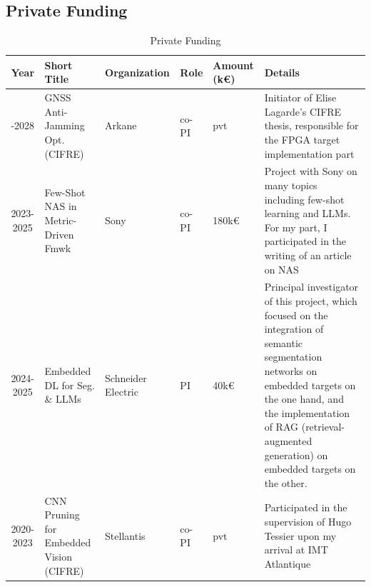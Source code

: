 \documentclass[11pt]{report}
\begin{document}
\begin{landscape}
  \subsection{Private Funding}
  {\small
    \begin{longtable}{|c|l|p{3cm}|p{1cm}|p{1.5cm}|p{6.5cm}|}
      \caption{Private Funding} \label{tab:financements_prives}                                                                                                                                                                                                                                                                                                                 \\
      \hline
      \textbf{Year} & \textbf{Short Title}                    & \textbf{Organization} & \textbf{Role} & \textbf{Amount (k€)} & \textbf{Details}                                                                                                                                                                                                                                 \\
      \hline
      \endhead
      \hline
      \endfoot
      \hline
      \endlastfoot
      2025-2028     & GNSS Anti-Jamming Opt. (CIFRE)          & Arkane                & co-PI         & pvt                  & Initiator of Elise Lagarde's CIFRE thesis, responsible for the FPGA target implementation part                                                                                                                                                   \\
      2023-2025     & Few-Shot NAS in Metric-Driven Fmwk      & Sony                  & co-PI         & 180k€                & Project with Sony on many topics including few-shot learning and LLMs. For my part, I participated in the writing of an article on NAS                                                                                                           \\
      2024-2025     & Embedded DL for Seg. \& LLMs            & Schneider Electric    & PI            & 40k€                 & Principal investigator of this project, which focused on the integration of semantic segmentation networks on embedded targets on the one hand, and the implementation of RAG (retrieval-augmented generation) on embedded targets on the other. \\
      2020-2023     & CNN Pruning for Embedded Vision (CIFRE) & Stellantis            & co-PI         & pvt                  & Participated in the supervision of Hugo Tessier upon my arrival at IMT Atlantique                                                                                                                                                                \\

\end{longtable}}
\end{landscape}
\end{document}
